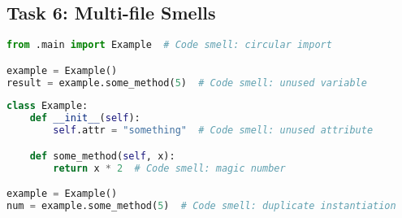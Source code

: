 \documentclass{article}
\begin{document}
\subsection{Task 6: Multi-file Smells}
\begin{lstlisting}[language=Python,caption={Extra1 File (extra1.py)},label=lst:task6a]
from .main import Example  # Code smell: circular import

example = Example()
result = example.some_method(5)  # Code smell: unused variable
\end{lstlisting}

\begin{lstlisting}[language=Python,caption={DMain File (main.py)},label=lst:task6b]
class Example:
    def __init__(self):
        self.attr = "something"  # Code smell: unused attribute

    def some_method(self, x):
        return x * 2  # Code smell: magic number

example = Example()
num = example.some_method(5)  # Code smell: duplicate instantiation
\end{lstlisting}
\end{document}
